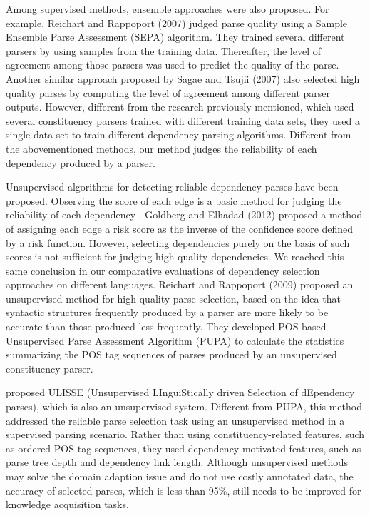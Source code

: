 \documentclass[english]{jnlp_1.4}
\begin{document}
Among supervised methods, ensemble approaches were also proposed.
For example, Reichart and Rappoport (2007)\nocite{Reichart:2007} judged parse quality using a 
Sample Ensemble Parse Assessment (SEPA) algorithm. They trained several
different parsers by using samples from the training data. Thereafter,
the level of agreement among those parsers was used to predict the quality
of the parse. Another similar approach proposed by Sagae and Tsujii (2007)
\nocite{Sagae:2007} also selected high quality parses by computing the
level of agreement among different parser outputs. However, different from the
research previously mentioned, which used several constituency parsers trained with
different training data sets, they used a single data set to train different dependency parsing algorithms. 
Different from the abovementioned methods, our method judges the reliability of each dependency produced by a parser.

Unsupervised algorithms for detecting reliable dependency
parses have been proposed. 
Observing the score of each edge is a basic method for judging the reliability of each dependency \cite{Iwatate:2012}.
\nocite{Yoav2012} Goldberg and Elhadad (2012) proposed a method of assigning each edge a risk score as the inverse of the confidence score defined by a risk function.
However, selecting dependencies purely on the basis of such scores is not sufficient for judging high quality dependencies.
We reached this same conclusion in our comparative evaluations of dependency selection approaches on different languages.
Reichart and Rappoport (2009)\nocite{Reichart:2009}
proposed an unsupervised method for high quality parse selection, based on the idea that syntactic
structures frequently produced by a parser are more likely to
be accurate than those produced less frequently.
They developed POS-based Unsupervised Parse Assessment Algorithm (PUPA) to
calculate the statistics summarizing the POS tag sequences of parses produced
by an unsupervised constituency parser.

 proposed 
ULISSE (Unsupervised LInguiStically driven Selection of
dEpendency parses), which is also an unsupervised system. Different from PUPA, 
this method addressed the reliable parse selection task using
an unsupervised method in a supervised parsing scenario. Rather than using constituency-related features, such as ordered POS tag sequences,
they used dependency-motivated features, such as parse tree depth and
dependency link length.
Although unsupervised methods may solve the domain adaption issue and
do not use costly annotated data, the
accuracy of selected parses, which is less than 95\%, still needs to be
improved for knowledge acquisition tasks.
\end{document}
